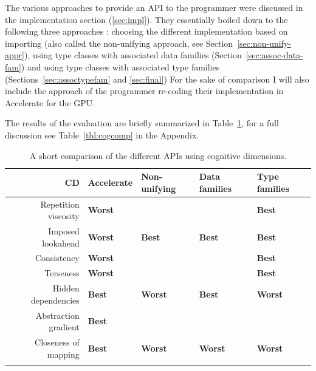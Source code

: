 \documentclass[12pt,a4paper,twoside]{scrbook}
\begin{document}
The various approaches to provide an API to the programmer were discussed in the
implementation section (\ref{sec:impl}). They essentially boiled down to the
following three approaches :
choosing the different implementation based on importing (also called the
non-unifying approach, see Section~\ref{sec:non-unify-appr}), using type classes
with associated data families (Section~\ref{sec:assoc-data-fam}) and using type
classes with associated type families (Sections~\ref{sec:assoctypefam} and
\ref{sec:final}) For the sake of comparison I will also include the approach of
the programmer re-coding their implementation in Accelerate for the GPU.

The results of the evaluation are briefly summarized in
Table~\ref{tbl:cogcompbrief}, for a full discussion see Table~\ref{tbl:cogcomp}
in the Appendix.

\newlength{\fstcollen} \newlength{\sndcollen}
\setlength{\fstcollen}{0.5cm}
\setlength{\sndcollen}{(\textwidth-\fstcollen-2cm)/4}
\begin{longtable}{r | l l l l}
\hline

CD & Accelerate & Non-unifying & Data families & Type families

\\ \hline

Repetition viscosity & \textbf{Worst} & & & \textbf{Best}
\\

Imposed lookahead & \textbf{Worst} & \textbf{Best} & \textbf{Best} &
\textbf{Best}
\\

Consistency & \textbf{Worst} & & & \textbf{Best}
\\

Terseness & \textbf{Worst} & & & \textbf{Best}
\\

Hidden dependencies & \textbf{Best} & \textbf{Worst} & \textbf{Best} &
\textbf{Worst}
\\

Abstraction gradient & \textbf{Best} & & &
\\

Closeness of mapping & \textbf{Best} & \textbf{Worst} & \textbf{Worst} &
\textbf{Worst}
\\
\hline

\caption{A short comparison of the different APIs using cognitive
  dimensions. \label{tbl:cogcompbrief}}
\end{longtable}
\end{document}
